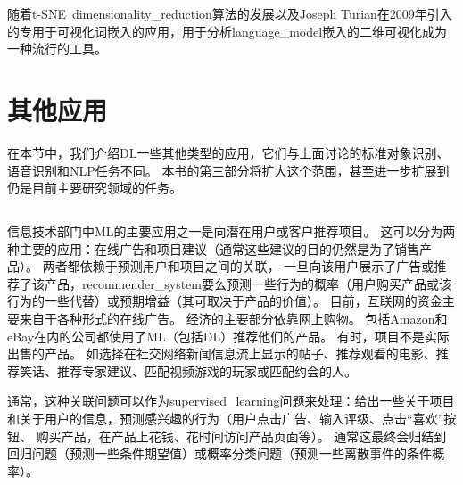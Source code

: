 随着t-SNE~\gls{dimensionality_reduction}算法的发展\citep{VanDerMaaten08-small}以及Joseph Turian在2009年引入的专用于可视化词嵌入的应用，用于分析\gls{language_model}嵌入的二维可视化成为一种流行的工具。

\section{其他应用}
\label{sec:other_applications}

在本节中，我们介绍\gls{DL}一些其他类型的应用，它们与上面讨论的标准对象识别、语音识别和\gls{NLP}任务不同。
本书的第三部分将扩大这个范围，甚至进一步扩展到仍是目前主要研究领域的任务。


\subsection{}
\label{sec:recommender_systems}
信息技术部门中\gls{ML}的主要应用之一是向潜在用户或客户推荐项目。
这可以分为两种主要的应用：在线广告和项目建议（通常这些建议的目的仍然是为了销售产品）。
两者都依赖于预测用户和项目之间的关联， 一旦向该用户展示了广告或推荐了该产品，\gls{recommender_system}要么预测一些行为的概率（用户购买产品或该行为的一些代替）或预期增益（其可取决于产品的价值）。
目前，互联网的资金主要来自于各种形式的在线广告。
经济的主要部分依靠网上购物。 
包括Amazon和eBay在内的公司都使用了\gls{ML}（包括\gls{DL}）推荐他们的产品。
有时，项目不是实际出售的产品。
如选择在社交网络新闻信息流上显示的帖子、推荐观看的电影、推荐笑话、推荐专家建议、匹配视频游戏的玩家或匹配约会的人。

通常，这种关联问题可以作为\gls{supervised_learning}问题来处理：给出一些关于项目和关于用户的信息，预测感兴趣的行为（用户点击广告、输入评级、点击``喜欢''按钮、 购买产品，在产品上花钱、花时间访问产品页面等）。
通常这最终会归结到回归问题（预测一些条件期望值）或概率分类问题（预测一些离散事件的条件概率）。

